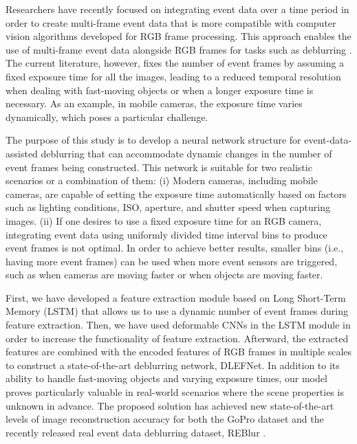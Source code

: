 \documentclass{article}
\begin{document}
Researchers have recently focused on integrating event data over a time period in order to create multi-frame event data that is more compatible with computer vision algorithms developed for RGB frame processing. This approach enables the use of multi-frame event data alongside RGB frames for tasks such as deblurring \cite{MADANet, EFNet}. The current literature, however, fixes the number of event frames by assuming a fixed exposure time for all the images, leading to a reduced temporal resolution when dealing with fast-moving objects or when a longer exposure time is necessary. As an example, in mobile cameras, the exposure time varies dynamically, which poses a particular challenge.

The purpose of this study is to develop a neural network structure for event-data-assisted deblurring that can accommodate dynamic changes in the number of event frames being constructed. This network is suitable for two realistic scenarios or a combination of them: (i) Modern cameras, including mobile cameras, are capable of setting the exposure time automatically based on factors such as lighting conditions, ISO, aperture, and shutter speed when capturing images. (ii) If one desires to use a fixed exposure time for an RGB camera, integrating event data using uniformly divided time interval bins to produce event frames is not optimal. In order to achieve better results, smaller bins (i.e., having more event frames) can be used when more event sensors are triggered, such as when cameras are moving faster or when objects are moving faster.

First, we have developed a feature extraction module based on Long Short-Term Memory (LSTM) that allows us to use a dynamic number of 
event frames during feature extraction. Then, we have used deformable CNNs in the LSTM module in order to increase the functionality 
of feature extraction. Afterward, the extracted features are combined with the encoded features of RGB frames in multiple scales to construct a state-of-the-art deblurring network, DLEFNet.  
In addition to its ability to handle fast-moving objects and varying exposure times, 
our model proves particularly valuable in real-world scenarios where the scene properties is unknown in advance. 
The proposed solution has achieved new state-of-the-art levels of image reconstruction accuracy for both the GoPro dataset \cite{GoPro} and the 
recently released real event data deblurring dataset, REBlur \cite{EFNet}.
\end{document}
